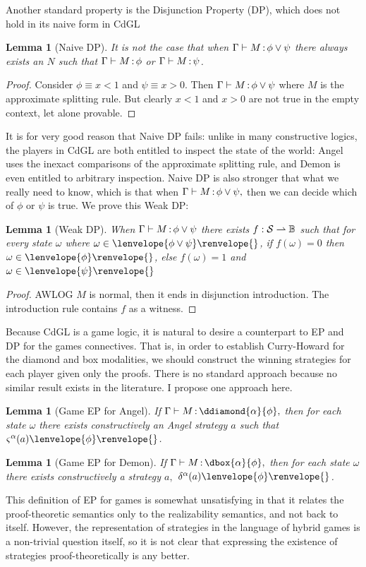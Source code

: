 \documentclass[12pt]{cmuthesis}
\newtheorem{lemma}[theorem]{Lemma}
\theoremstyle{definition}
\theoremstyle{remark}
\newcommand{\allstate}{\mathcal{S}}
\newcommand{\CdGL}{\textsf{CdGL}\xspace}
\newcommand{\fint}[1]{\lenvelope{#1}\renvelope}
\begin{document}
Another standard property is the Disjunction Property (DP), which does not hold in its naive form in \CdGL
\begin{lemma}[Naive DP]
It is not the case that when $\Gamma \vdash M\mathop{:}\phi \lor \psi$ there always exists an $N$ such that $\Gamma \vdash M\mathop{:}\phi$ or $\Gamma \vdash M\mathop{:}\psi$.
\end{lemma}
\begin{proof}
  Consider $\phi \equiv x < 1$ and $\psi \equiv x > 0$.
  Then $\Gamma \vdash M\mathop{:}\phi \lor \psi$ where $M$ is the approximate splitting rule.
  But clearly $x < 1$ and $x > 0$ are not true in the empty context, let alone provable.
\end{proof}

It is for very good reason that Naive DP fails: unlike in many constructive logics, the players in \CdGL are both entitled to inspect the state of the world: 
Angel uses the inexact comparisons of the approximate splitting rule, and Demon is even entitled to arbitrary inspection.
Naive DP is also stronger that what we really need to know, which is that when $\Gamma \vdash M\mathop{:}\phi \lor \psi,$ then we can decide which of $\phi$ or $\psi$ is true.
We prove this Weak DP:
\begin{lemma}[Weak DP]
When $\Gamma \vdash M\mathop{:}\phi \lor \psi$ there exists $f : \allstate \mto \mathbb{B}$ such that for every state $\omega$ where $\omega \in \fint{\phi \lor \psi}{}$, if $f(\omega)=0$ then $\omega \in \fint{\phi}{}$, else $f(\omega)=1$ and $\omega \in \fint{\psi}{}
$\end{lemma}
\begin{proof}
  AWLOG $M$ is normal, then it ends in disjunction introduction.
  The introduction rule contains $f$ as a witness.
\end{proof}

Because \CdGL is a game logic, it is natural to desire a counterpart to EP and DP for the games connectives.
That is, in order to establish Curry-Howard for the diamond and box modalities, we should construct the winning strategies for each player given only the proofs.
There is no standard approach because no similar result exists in the literature.
I propose one approach here.
\begin{lemma}[Game EP for Angel]
If $\proves{\Gamma}{M}{\ddiamond{\alpha}{\phi}},$ then for each state $\omega$ there exists constructively an Angel strategy $a$ such that 
$\strategyforR{\alpha}{a}{\fint{\phi}{}}$.
\end{lemma}
\begin{lemma}[Game EP for Demon]
If $\proves{\Gamma}{M}{\dbox{\alpha}{\phi}},$ then for each state $\omega$ there exists constructively a strategy $a,$
$\dstrategyforR{\alpha}{a}{\fint{\phi}{}}$.
\end{lemma}
This definition of EP for games is somewhat unsatisfying in that it relates the proof-theoretic semantics only to the realizability semantics, and not back to itself.
However, the representation of strategies in the language of hybrid games is a non-trivial question itself, so it is not clear that expressing the existence of strategies proof-theoretically is any better.
\end{document}
